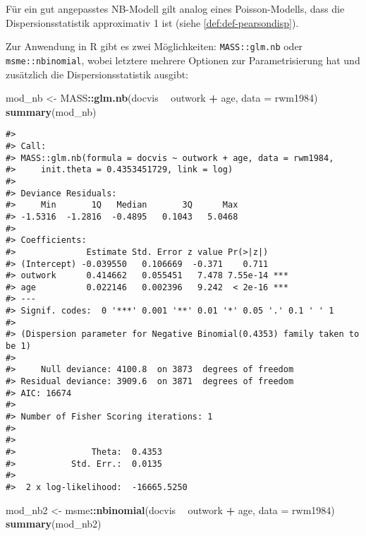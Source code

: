 \documentclass[ngerman,a4paper,]{scrartcl}
\newenvironment{Shaded}{\begin{snugshade}}{\end{snugshade}}
\newcommand{\DataTypeTok}[1]{\textcolor[rgb]{0.13,0.29,0.53}{#1}}
\newcommand{\KeywordTok}[1]{\textcolor[rgb]{0.13,0.29,0.53}{\textbf{#1}}}
\newcommand{\NormalTok}[1]{#1}
\newcommand{\OperatorTok}[1]{\textcolor[rgb]{0.81,0.36,0.00}{\textbf{#1}}}
\newcommand{\StringTok}[1]{\textcolor[rgb]{0.31,0.60,0.02}{#1}}
\theoremstyle{definition}
\theoremstyle{definition}
\theoremstyle{definition}
\theoremstyle{remark}
\begin{document}
Für ein gut angepasstes NB-Modell gilt analog eines Poisson-Modells, dass die Dispersionsstatistik approximativ 1 ist (siehe \ref{def:def-pearsondisp}).

Zur Anwendung in R gibt es zwei Möglichkeiten: \texttt{MASS::glm.nb} oder \texttt{msme::nbinomial}, wobei letztere mehrere Optionen zur Parametrisierung hat und zusätzlich die Dispersionsstatistik ausgibt:

\begin{Shaded}
\begin{Highlighting}[]
\NormalTok{mod_nb <-}\StringTok{ }\NormalTok{MASS}\OperatorTok{::}\KeywordTok{glm.nb}\NormalTok{(docvis }\OperatorTok{~}\StringTok{ }\NormalTok{outwork }\OperatorTok{+}\StringTok{ }\NormalTok{age,}
                       \DataTypeTok{data =}\NormalTok{ rwm1984)}
\KeywordTok{summary}\NormalTok{(mod_nb)}
\end{Highlighting}
\end{Shaded}

\begin{verbatim}
#> 
#> Call:
#> MASS::glm.nb(formula = docvis ~ outwork + age, data = rwm1984, 
#>     init.theta = 0.4353451729, link = log)
#> 
#> Deviance Residuals: 
#>     Min       1Q   Median       3Q      Max  
#> -1.5316  -1.2816  -0.4895   0.1043   5.0468  
#> 
#> Coefficients:
#>              Estimate Std. Error z value Pr(>|z|)    
#> (Intercept) -0.039550   0.106669  -0.371    0.711    
#> outwork      0.414662   0.055451   7.478 7.55e-14 ***
#> age          0.022146   0.002396   9.242  < 2e-16 ***
#> ---
#> Signif. codes:  0 '***' 0.001 '**' 0.01 '*' 0.05 '.' 0.1 ' ' 1
#> 
#> (Dispersion parameter for Negative Binomial(0.4353) family taken to be 1)
#> 
#>     Null deviance: 4100.8  on 3873  degrees of freedom
#> Residual deviance: 3909.6  on 3871  degrees of freedom
#> AIC: 16674
#> 
#> Number of Fisher Scoring iterations: 1
#> 
#> 
#>               Theta:  0.4353 
#>           Std. Err.:  0.0135 
#> 
#>  2 x log-likelihood:  -16665.5250
\end{verbatim}

\begin{Shaded}
\begin{Highlighting}[]
\NormalTok{mod_nb2 <-}\StringTok{ }\NormalTok{msme}\OperatorTok{::}\KeywordTok{nbinomial}\NormalTok{(docvis }\OperatorTok{~}\StringTok{ }\NormalTok{outwork }\OperatorTok{+}\StringTok{ }\NormalTok{age,}
                           \DataTypeTok{data =}\NormalTok{ rwm1984)}
\KeywordTok{summary}\NormalTok{(mod_nb2)}
\end{Highlighting}
\end{Shaded}
\end{document}

